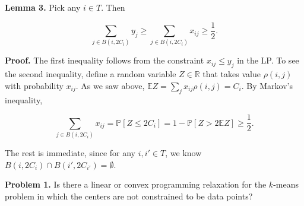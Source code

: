 \documentclass{article}
\begin{document}
\textbf{Lemma 3.} Pick any $i \in T$. Then

\begin{equation*}
\sum_{j \in B(i, 2 C_{i})} y_{j} \geq \sum_{j \in B(i, 2 C_{i})} x_{i j} \geq \frac{1}{2}.
\end{equation*}

\textbf{Proof.} The first inequality follows from the constraint $x_{i j} \leq y_{j}$ in the LP. To see the second inequality, define a random variable $Z \in \mathbb{R}$ that takes value $\rho(i, j)$ with probability $x_{i j}$. As we saw above, $\mathbb{E} Z = \sum_{j} x_{i j} \rho(i, j) = C_{i}$. By Markov's inequality,

\begin{equation*}
\sum_{j \in B(i, 2 C_{i})} x_{i j} = \mathbb{P}\left[Z \leq 2 C_{i}\right] = 1 - \mathbb{P}[Z > 2 \mathbb{E} Z] \geq \frac{1}{2}.
\end{equation*}

The rest is immediate, since for any $i, i' \in T$, we know $B(i, 2 C_{i}) \cap B(i', 2 C_{i'}) = \emptyset$.

\textbf{Problem 1.} Is there a linear or convex programming relaxation for the $k$-means problem in which the centers are not constrained to be data points?
\end{document}
